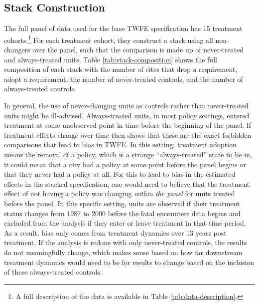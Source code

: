 \documentclass[12pt]{article}
\begin{document}
\subsection{Stack Construction}

The full panel of data used for the base TWFE specification has 15 treatment cohorts.\footnote{A full description of the data is available in Table \ref{tab:data-description}.} For each treatment cohort, they construct a stack using all non-changers over the panel, such that the comparison is made up of never-treated and always-treated units. Table \ref{tab:stack-composition} shows the full composition of each stack with the number of cites that drop a requirement, adopt a requirement, the number of never-treated controls, and the number of always-treated controls. 

In general, the use of never-changing units as controls rather than never-treated units might be ill-advised. Always-treated units, in most policy settings, entered treatment at some unobserved point in time before the beginning of the panel. If treatment effects change over time then \textcite{goodman2021difference} shows that these are the exact forbidden comparisons that lead to bias in TWFE. In this setting, treatment adoption means the removal of a policy, which is a strange ``always-treated'' state to be in, it could mean that a city had a policy at some point before the panel begins or that they never had a policy at all. For this to lead to bias in the estimated effects in the stacked specification, one would need to believe that the treatment effect of not having a policy was changing \textit{within the panel} for units treated before the panel. In this specific setting, units are observed if their treatment status changes from 1987 to 2000 before the fatal encounters data begins and excluded from the analysis if they enter or leave treatment in that time period. As a result, bias only comes from treatment dynamics over 13 years post treatment. If the analysis is redone with only never-treated controls, the results do not meaningfully change, which makes sense based on how far downstream treatment dynamics would need to be for results to change based on the inclusion of these always-treated controls.
\end{document}
